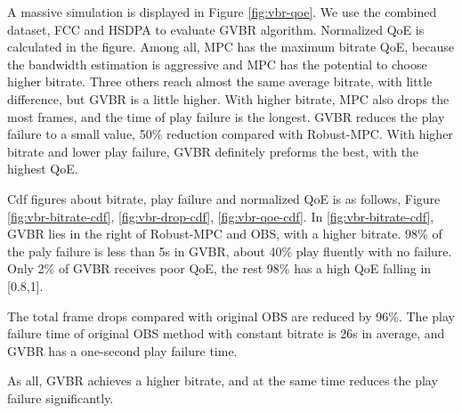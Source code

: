 A massive simulation is displayed in Figure \ref{fig:vbr-qoe}. We use the combined dataset, FCC and HSDPA to evaluate GVBR algorithm. Normalized QoE is calculated in the figure. Among all, MPC has the maximum bitrate QoE, because the bandwidth estimation is aggressive and MPC has the potential to choose higher bitrate. Three others reach almost the same average bitrate, with little difference, but GVBR is a little higher. With higher bitrate, MPC also drops the most frames, and the time of play failure is the longest. GVBR reduces the play failure to a small value, 50\% reduction compared with Robust-MPC. With higher bitrate and lower play failure, GVBR definitely preforms the best, with the highest QoE.

Cdf figures about bitrate, play failure and normalized QoE is as follows, Figure \ref{fig:vbr-bitrate-cdf}, \ref{fig:vbr-drop-cdf}, \ref{fig:vbr-qoe-cdf}. In \ref{fig:vbr-bitrate-cdf}, GVBR lies in the right of Robust-MPC and OBS, with a higher bitrate. $98\%$ of the paly failure is less than 5s in GVBR, about 40\% play fluently with no failure. Only 2\% of GVBR receives poor QoE, the rest 98\% has a high QoE falling in [0.8,1].

The total frame drops compared with original OBS are reduced by 96\%. The play failure time of original OBS method with constant bitrate is 26s in average, and GVBR has a one-second play failure time.

As all, GVBR achieves a higher bitrate, and at the same time reduces the play failure significantly.

